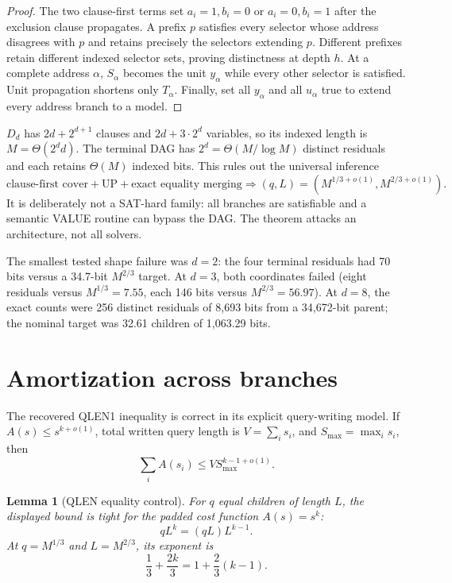 \documentclass[11pt]{article}
\newtheorem{lemma}[theorem]{Lemma}
\begin{document}
\begin{proof}
The two clause-first terms set $a_i=1,b_i=0$ or $a_i=0,b_i=1$ after the
exclusion clause propagates.  A prefix $p$ satisfies every selector whose
address disagrees with $p$ and retains precisely the selectors extending
$p$.  Different prefixes retain different indexed selector sets, proving
distinctness at depth $h$.  At a complete address $\alpha$, $S_\alpha$
becomes the unit $y_\alpha$ while every other selector is satisfied.  Unit
propagation shortens only $T_\alpha$.  Finally, set all $y_\alpha$ and all
$u_\alpha$ true to extend every address branch to a model.
\end{proof}

$D_d$ has $2d+2^{d+1}$ clauses and $2d+3\cdot2^d$ variables, so its indexed
length is $M=\Theta(2^d d)$.  The terminal DAG has $2^d=\Theta(M/\log M)$
distinct residuals and each retains $\Theta(M)$ indexed bits.  This rules out
the universal inference
\[
 \text{clause-first cover}+\text{UP}+\text{exact equality merging}
 \Longrightarrow (q,L)=(M^{1/3+o(1)},M^{2/3+o(1)}).
\]
It is deliberately not a SAT-hard family: all branches are satisfiable and a
semantic VALUE routine can bypass the DAG.  The theorem attacks an
architecture, not all solvers.

The smallest tested shape failure was $d=2$: the four terminal residuals had
70 bits versus a 34.7-bit $M^{2/3}$ target.  At $d=3$, both coordinates failed
(eight residuals versus $M^{1/3}=7.55$, each 146 bits versus
$M^{2/3}=56.97$).  At $d=8$, the exact counts were 256 distinct residuals of
8,693 bits from a 34,672-bit parent; the nominal target was 32.61 children of
1,063.29 bits.

\section{Amortization across branches}

The recovered QLEN1 inequality is correct in its explicit query-writing
model.  If $A(s)\le s^{k+o(1)}$, total written query length is
$V=\sum_i s_i$, and $S_{\max}=\max_i s_i$, then
\[
 \sum_i A(s_i)\le V S_{\max}^{k-1+o(1)}.
\]

\begin{lemma}[QLEN equality control]
For $q$ equal children of length $L$, the displayed bound is tight for the
padded cost function $A(s)=s^k$:
\[
 qL^k=(qL)L^{k-1}.
\]
At $q=M^{1/3}$ and $L=M^{2/3}$, its exponent is
\[
 \frac13+\frac{2k}{3}=1+\frac23(k-1).
\]
\end{lemma}
\end{document}
